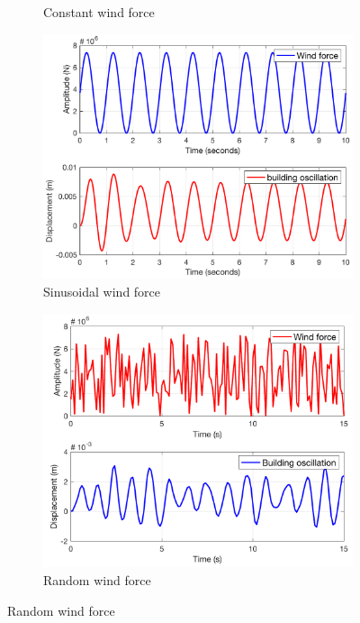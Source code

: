 \begin{figure}[H]
\begin{subfigure}{0.495\textwidth}
        \caption{Constant wind force}
        \label{fig:q4.constant}
    \end{subfigure}
    \begin{subfigure}{0.495\textwidth}
        \includegraphics[width=\textwidth]{resources/pdf/sinusoidal.pdf}
        \caption{Sinusoidal wind force}
    \end{subfigure}
    \begin{subfigure}{0.495\textwidth}
        \includegraphics[width=\textwidth]{resources/pdf/random.pdf}
        \caption{Random wind force}
    \end{subfigure}
\end{figure}
